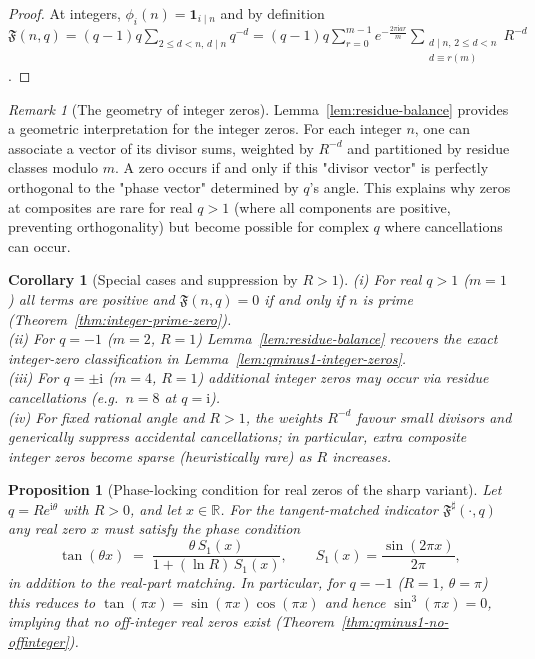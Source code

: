 \documentclass[11pt,a4paper]{amsart}
\newcommand{\R}{\mathbb{R}}
\newcommand{\Fbase}{\mathfrak F}
\newcommand{\Fsharp}{\Fbase^{\sharp}}
\theoremstyle{plain}
\newtheorem{proposition}[theorem]{Proposition}
\newtheorem{corollary}[theorem]{Corollary}
\theoremstyle{definition}
\theoremstyle{remark}
\newtheorem{remark}[theorem]{Remark}
\begin{document}
\begin{proof}
At integers, $\phi_i(n)=\mathbf 1_{i\mid n}$ and by definition
$\mathfrak F(n,q)=(q-1)q\sum_{2\le d<n,\,d\mid n} q^{-d}
=(q-1)q\sum_{r=0}^{m-1} e^{-\tfrac{2\pi \mathrm{i} a r}{m}}
\sum_{\substack{d\mid n,\,2\le d<n\\ d\equiv r (m)}} R^{-d}$.
\end{proof}

\begin{remark}[The geometry of integer zeros]
Lemma~\ref{lem:residue-balance} provides a geometric interpretation for the integer zeros. For each integer $n$, one can associate a vector of its divisor sums, weighted by $R^{-d}$ and partitioned by residue classes modulo $m$. A zero occurs if and only if this "divisor vector" is perfectly orthogonal to the "phase vector" determined by $q$'s angle. This explains why zeros at composites are rare for real $q>1$ (where all components are positive, preventing orthogonality) but become possible for complex $q$ where cancellations can occur.
\end{remark}

\begin{corollary}[Special cases and suppression by $R>1$]
\label{cor:special-cases}
(i) For real $q>1$ ($m=1$) all terms are positive and $\mathfrak F(n,q)=0$ if and only if $n$ is prime (Theorem~\ref{thm:integer-prime-zero}).\\
(ii) For $q=-1$ ($m=2$, $R=1$) Lemma~\ref{lem:residue-balance} recovers the exact integer-zero classification in Lemma~\ref{lem:qminus1-integer-zeros}.\\
(iii) For $q=\pm\mathrm{i}$ ($m=4$, $R=1$) additional integer zeros may occur via residue cancellations (e.g.\ $n=8$ at $q=\mathrm{i}$).\\
(iv) For fixed rational angle and $R>1$, the weights $R^{-d}$ favour small divisors and generically suppress accidental cancellations; in particular, extra composite integer zeros become sparse (heuristically rare) as $R$ increases.
\end{corollary}

\begin{proposition}[Phase-locking condition for real zeros of the sharp variant]
\label{prop:phase-locking}
Let $q=R e^{\mathrm{i}\theta}$ with $R>0$, and let $x\in\R$.
For the tangent-matched indicator $\Fsharp(\cdot,q)$ any real zero $x$ must satisfy the \emph{phase condition}
\[
\tan(\theta x)\;=\;\frac{\theta\,S_1(x)}{1+(\ln R)\,S_1(x)},
\qquad S_1(x)=\frac{\sin(2\pi x)}{2\pi},
\]
in addition to the real-part matching. In particular, for $q=-1$ ($R=1$, $\theta=\pi$) this reduces to
$\tan(\pi x)=\sin(\pi x)\cos(\pi x)$ and hence $\sin^3(\pi x)=0$, implying that no off-integer real zeros exist
(Theorem~\ref{thm:qminus1-no-offinteger}).
\end{proposition}
\end{document}

